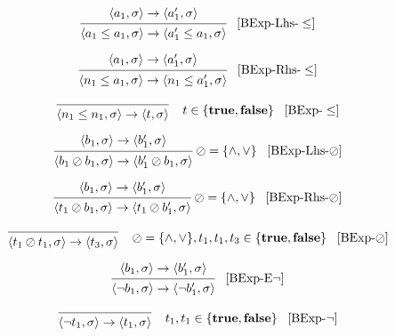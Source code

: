 \[
\begin{prooftree}
\hypo{
	\langle a_1, \sigma \rangle \rightarrow
	\langle a_1^\prime, \sigma \rangle 
} 
\infer1{
	\langle a_1 \leq a_1, \sigma \rangle \rightarrow  
	\langle a_1^\prime \leq a_1, \sigma \rangle
}
\end{prooftree} \; \; \; [\text{BExp-Lhs-}\leq]
\]

\[
\begin{prooftree}
\hypo{
	\langle a_1, \sigma \rangle \rightarrow
	\langle a_1^\prime, \sigma \rangle 
} 
\infer1{
	\langle n_1 \leq a_1, \sigma \rangle \rightarrow  
	\langle n_1 \leq a_1^\prime, \sigma \rangle
}
\end{prooftree} \; \; \; [\text{BExp-Rhs-}\leq]
\]

\[
\begin{prooftree}
\infer0{
	\langle n_1 \leq n_1, \sigma \rangle \rightarrow  
	\langle t, \sigma \rangle
}
\end{prooftree} \; \; \; \; t \in \{ \textbf{true}, \textbf{false} \} \; \; \; [\text{BExp-}\leq]
\]

\[
\begin{prooftree}
\hypo{
	\langle b_1, \sigma \rangle \rightarrow
	\langle b_1^\prime, \sigma \rangle 
} 
\infer1{
	\langle b_1 \oslash b_1, \sigma \rangle \rightarrow  
	\langle b_1^\prime \oslash b_1, \sigma \rangle
}
\end{prooftree} \; \oslash = \{\land,\lor\} \; \; \; [\text{BExp-Lhs-}\oslash]
\]

\[
\begin{prooftree}
\hypo{
	\langle b_1, \sigma \rangle \rightarrow
	\langle b_1^\prime, \sigma \rangle 
} 
\infer1{
	\langle t_1 \oslash b_1, \sigma \rangle \rightarrow  
	\langle t_1 \oslash b_1^\prime, \sigma \rangle
}
\end{prooftree} \; \oslash = \{\land,\lor\} \; \; \; [\text{BExp-Rhs-}\oslash]
\]

\[
\begin{prooftree}
\infer0{
	\langle t_1 \oslash t_1, \sigma \rangle \rightarrow  
	\langle t_3,  \sigma \rangle
}
\end{prooftree} \; \; \; \; \oslash = \{\land,\lor\}, t_1, t_1, t_3 \in \{ \textbf{true}, \textbf{false} \}  \; \; \; [\text{BExp-}\oslash]
\]

\[
\begin{prooftree}
\hypo{
	\langle b_1, \sigma \rangle \rightarrow  
	\langle b_1^\prime,  \sigma \rangle
}
\infer1{
	\langle \neg b_1, \sigma \rangle \rightarrow  
	\langle \neg b_1^\prime,  \sigma \rangle
}
\end{prooftree} \; \; \; [\text{BExp-E}\neg]
\]

\[
\begin{prooftree}
\infer0{
	\langle \neg t_1, \sigma \rangle \rightarrow  
	\langle t_1,  \sigma \rangle
}
\end{prooftree} \; \; \; \; t_1, t_1 \in \{ \textbf{true}, \textbf{false} \}  \; \; \; [\text{BExp-}\neg]
\]


